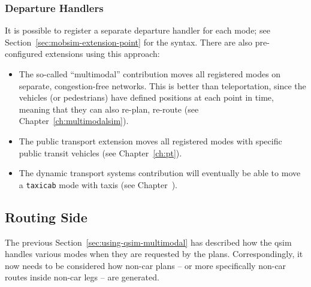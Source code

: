 \subsubsection{Departure Handlers}
\label{sec:departure-handlers}
It is possible to register a separate departure handler for each mode; see Section~\ref{sec:mobsim-extension-point} for the syntax.  There are also pre-configured extensions using this approach:
%
\begin{itemize}\styleItemize

\item The so-called ``multimodal'' contribution moves all registered modes on separate, congestion-free networks.  This is better than \gls{teleportation}, since the vehicles (or pedestrians) have defined positions at each point in time, meaning that they can also re-plan, \eg re-route (see Chapter~\ref{ch:multimodalsim}).

\item The public transport extension moves all registered modes with specific public transit vehicles (see Chapter~\ref{ch:pt}).

\item The dynamic transport systems contribution will eventually be able to move a \lstinline{taxicab} mode with taxis (see Chapter~\pageref{ch:dts}). 


\end{itemize}

\subsection{Routing Side}
\label{sec:using-routing-multimodal}

The previous Section~\ref{sec:using-qsim-multimodal} has described how the \gls{qsim} handles various modes when they are requested by the plans.
%
Correspondingly, it now needs to be considered how non-car plans -- or more specifically non-car routes inside non-car legs -- are generated.


